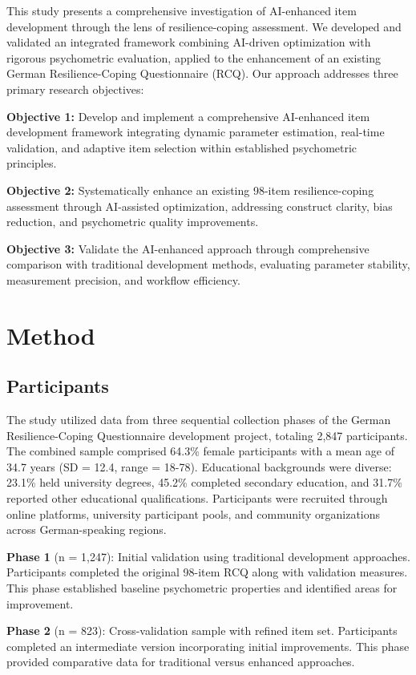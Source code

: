 \documentclass[12pt,a4paper]{article}
\begin{document}
This study presents a comprehensive investigation of AI-enhanced item development through the lens of resilience-coping assessment. We developed and validated an integrated framework combining AI-driven optimization with rigorous psychometric evaluation, applied to the enhancement of an existing German Resilience-Coping Questionnaire (RCQ). Our approach addresses three primary research objectives:

\textbf{Objective 1:} Develop and implement a comprehensive AI-enhanced item development framework integrating dynamic parameter estimation, real-time validation, and adaptive item selection within established psychometric principles.

\textbf{Objective 2:} Systematically enhance an existing 98-item resilience-coping assessment through AI-assisted optimization, addressing construct clarity, bias reduction, and psychometric quality improvements.

\textbf{Objective 3:} Validate the AI-enhanced approach through comprehensive comparison with traditional development methods, evaluating parameter stability, measurement precision, and workflow efficiency.

\section{Method}

\subsection{Participants}

The study utilized data from three sequential collection phases of the German Resilience-Coping Questionnaire development project, totaling 2,847 participants. The combined sample comprised 64.3\% female participants with a mean age of 34.7 years (SD = 12.4, range = 18-78). Educational backgrounds were diverse: 23.1\% held university degrees, 45.2\% completed secondary education, and 31.7\% reported other educational qualifications. Participants were recruited through online platforms, university participant pools, and community organizations across German-speaking regions.

\textbf{Phase 1} (n = 1,247): Initial validation using traditional development approaches. Participants completed the original 98-item RCQ along with validation measures. This phase established baseline psychometric properties and identified areas for improvement.

\textbf{Phase 2} (n = 823): Cross-validation sample with refined item set. Participants completed an intermediate version incorporating initial improvements. This phase provided comparative data for traditional versus enhanced approaches.
\end{document}
